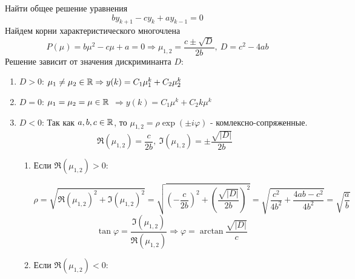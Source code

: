 \begin{example}
  Найти общее решение уравнения
  \[by_{k+1}-cy_k+ay_{k-1}=0\]
  Найдем корни характеристического многочлена
  \[P(\mu)=b\mu^2-c\mu+a=0 \Rightarrow \mu_{1,2}=\frac{c\pm\sqrt{D}}{2b},\ D=c^2-4ab \]
  Решение зависит от значения дискриминанта $D$:
  \begin{enumerate}
    \item $D>0$: $\mu_1\neq\mu_2\in\mathbb{R}\Rightarrow y(k)=C_1\mu_1^k+C_2\mu_2^k$
    \item $D=0$: $\mu_1=\mu_2=\mu\in\mathbb{R}$ $\Rightarrow y(k)=C_1\mu^k+C_2k\mu^k$
    \item $D<0$: Так как $a,b,c\in\mathbb{R}$, то $\mu_{1,2}=\rho\exp{(\pm i \varphi)}$ - комлексно-сопряженные.
          \[\Re(\mu_{1,2})=\frac{c}{2b},\ \Im(\mu_{1,2})=\pm\frac{\sqrt{|D|}}{2b}\]
          \begin{enumerate}
            \item Если $\Re(\mu_{1,2})>0$:

                  \begin{minipage}{.3\linewidth}
                  \end{minipage}\hfill
                  \begin{minipage}{.7\linewidth}
                    \[\rho=\sqrt{\Re(\mu_{1,2})^2 + \Im(\mu_{1,2})^2}=\sqrt{\left(-\frac{c}{2b}\right)^2 + \left(\frac{\sqrt{|D|}}{2b}\right)^2}=\sqrt{\frac{c^2}{4b^2} + \frac{4ab-c^2}{4b^2}}=\sqrt{\frac{a}{b}}\]
                    \[\tan{\varphi}=\frac{\Im(\mu_{1,2})}{\Re(\mu_{1,2})}\Rightarrow\varphi=\arctan{\frac{\sqrt{|D|}}{c}}\]
                  \end{minipage}
            \item Если $\Re(\mu_{1,2})<0$:


\end{enumerate}
\end{enumerate}
\end{example}
